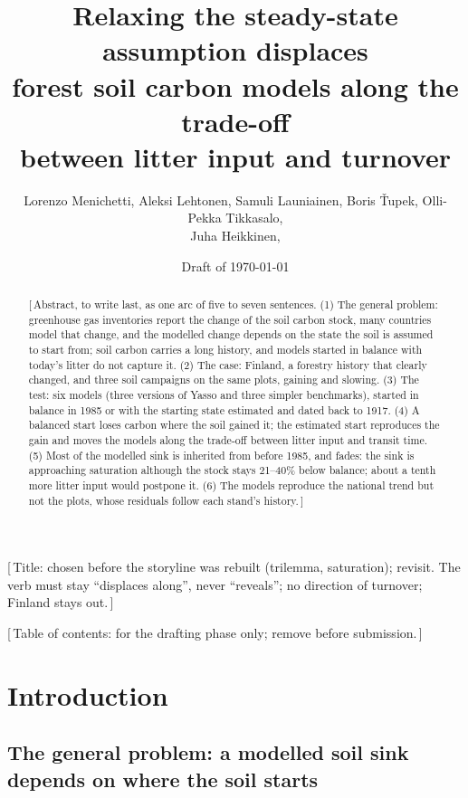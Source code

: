 \documentclass[11pt]{article}
\title{\vspace{-1.2cm}Relaxing the steady-state assumption displaces\\
forest soil carbon models along the trade-off\\
between litter input and turnover}
\author{Lorenzo Menichetti, Aleksi Lehtonen, Samuli Launiainen, Boris {\v T}upek,
        Olli-Pekka Tikkasalo, \\
        Juha Heikkinen, \gap{possibly others; order and affiliations to be decided;
        Mikko Peltoniemi to be asked}}
\date{Draft of \today}
\newcommand{\gap}[1]{\textcolor{red!70!black}{\small[\,#1\,]}}
\begin{document}
\maketitle
\gap{Title: chosen before the storyline was rebuilt (trilemma, saturation); revisit. The verb
must stay ``displaces along'', never ``reveals''; no direction of turnover; Finland stays out.}

\begin{abstract}
\gap{Abstract, to write last, as one arc of five to seven sentences. (1) The general problem:
greenhouse gas inventories report the change of the soil carbon stock, many countries model that
change, and the modelled change depends on the state the soil is assumed to start from; soil
carbon carries a long history, and models started in balance with today's litter do not capture
it. (2) The case: Finland, a forestry history that clearly changed, and three soil
campaigns on the same plots, gaining and slowing. (3) The test: six models (three versions of
Yasso and three simpler benchmarks), started in balance in 1985 or with the starting state
estimated and dated back to 1917. (4) A balanced start loses carbon where the soil gained it;
the estimated start reproduces the gain and moves the models along the trade-off between litter
input and transit time. (5) Most of the modelled sink is inherited from before 1985, and fades:
the sink is approaching saturation although the stock stays 21--40\% below balance; about a
tenth more litter input would postpone it. (6) The models reproduce the national trend but not
the plots, whose residuals follow each stand's history.}
\end{abstract}

{\small\tableofcontents}
\gap{Table of contents: for the drafting phase only; remove before submission.}

\section{Introduction}\label{sec:intro}

\subsection{The general problem: a modelled soil sink depends on where the soil starts}
\end{document}

